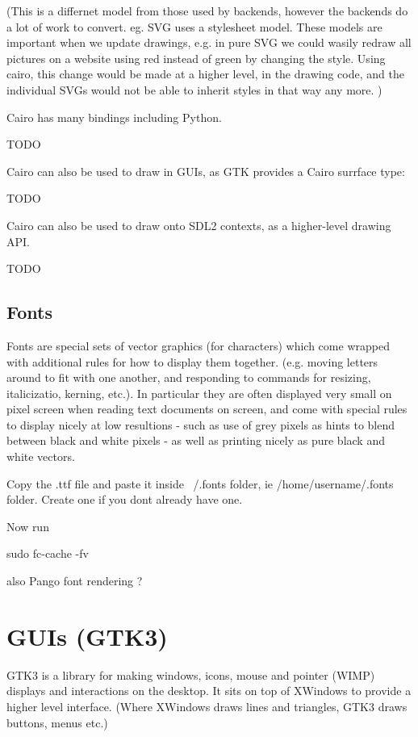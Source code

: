 \documentclass[oneside,english]{scrbook}
\begin{document}
(This is a differnet model from those used by backends, however the backends do a lot of work to convert. eg. SVG uses a stylesheet model.  These models are important when we update drawings, e.g. in pure SVG we could wasily redraw all pictures on a website using red instead of green by changing the style. Using cairo, this change would be made at a higher level, in the drawing code, and the individual SVGs would not be able to inherit styles in that way any more. )



Cairo has many bindings including Python.

TODO
%

Cairo can also be used to draw in GUIs, as GTK provides a Cairo surrface type:

TODO
%

Cairo can also be used to draw onto SDL2 contexts, as a higher-level drawing API.

TODO

\section{Fonts}

Fonts are special sets of vector graphics (for characters) which come wrapped with additional rules for how to display them together. (e.g. moving letters around to fit with one another, and responding to commands for resizing, italicizatio, kerning, etc.). In particular they are often displayed very small on pixel screen when reading text documents on screen, and come with special rules to display nicely at low resultions - such as use of grey pixels as hints to blend between black and white pixels - as well as printing nicely as pure black and white vectors.

Copy the .ttf file and paste it inside ~/.fonts folder, ie /home/username/.fonts folder. Create one if you dont already have one.

Now run

sudo fc-cache -fv


also Pango font rendering ?


\chapter{GUIs (GTK3)}

GTK3 is a library for making windows, icons, mouse and pointer (WIMP) displays and interactions on the desktop.   It sits on top of XWindows to provide a higher level interface.    (Where XWindows draws lines and triangles, GTK3 draws buttons, menus etc.)
\end{document}
